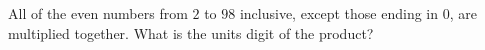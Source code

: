 All of the even numbers from $2$ to $98$ inclusive, except those ending in $0$, are multiplied together. What is the units digit of the product?
